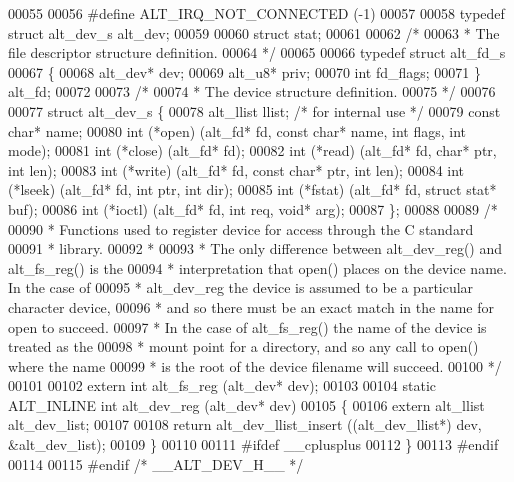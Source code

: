 \begin{DoxyCode}
00055 
00056 \textcolor{preprocessor}{#define ALT\_IRQ\_NOT\_CONNECTED (-1)}
00057 
00058 \textcolor{keyword}{typedef} \textcolor{keyword}{struct }alt_dev_s alt_dev;
00059 
00060 \textcolor{keyword}{struct }stat;
00061 
00062 \textcolor{comment}{/*}
00063 \textcolor{comment}{ * The file descriptor structure definition.}
00064 \textcolor{comment}{ */}
00065 
00066 \textcolor{keyword}{typedef} \textcolor{keyword}{struct }alt_fd_s
00067 \{
00068   alt_dev* dev;
00069   alt_u8*  priv;
00070   \textcolor{keywordtype}{int}      fd_flags;
00071 \} alt_fd;
00072 
00073 \textcolor{comment}{/* }
00074 \textcolor{comment}{ * The device structure definition. }
00075 \textcolor{comment}{ */}
00076  
00077 \textcolor{keyword}{struct }alt_dev_s \{
00078   alt_llist    llist;     \textcolor{comment}{/* for internal use */}
00079   \textcolor{keyword}{const} \textcolor{keywordtype}{char}*  name; 
00080   int (*open)  (alt_fd* fd, \textcolor{keyword}{const} \textcolor{keywordtype}{char}* name, \textcolor{keywordtype}{int} flags, \textcolor{keywordtype}{int} mode);
00081   int (*close) (alt_fd* fd);
00082   int (*read)  (alt_fd* fd, \textcolor{keywordtype}{char}* ptr, \textcolor{keywordtype}{int} len);
00083   int (*write) (alt_fd* fd, \textcolor{keyword}{const} \textcolor{keywordtype}{char}* ptr, \textcolor{keywordtype}{int} len); 
00084   int (*lseek) (alt_fd* fd, \textcolor{keywordtype}{int} ptr, \textcolor{keywordtype}{int} dir);
00085   int (*fstat) (alt_fd* fd, \textcolor{keyword}{struct }stat* buf);
00086   int (*ioctl) (alt_fd* fd, \textcolor{keywordtype}{int} req, \textcolor{keywordtype}{void}* arg);
00087 \};
00088 
00089 \textcolor{comment}{/*}
00090 \textcolor{comment}{ * Functions used to register device for access through the C standard }
00091 \textcolor{comment}{ * library.}
00092 \textcolor{comment}{ *}
00093 \textcolor{comment}{ * The only difference between alt\_dev\_reg() and alt\_fs\_reg() is the }
00094 \textcolor{comment}{ * interpretation that open() places on the device name. In the case of}
00095 \textcolor{comment}{ * alt\_dev\_reg the device is assumed to be a particular character device,}
00096 \textcolor{comment}{ * and so there must be an exact match in the name for open to succeed. }
00097 \textcolor{comment}{ * In the case of alt\_fs\_reg() the name of the device is treated as the}
00098 \textcolor{comment}{ * mount point for a directory, and so any call to open() where the name }
00099 \textcolor{comment}{ * is the root of the device filename will succeed. }
00100 \textcolor{comment}{ */}
00101 
00102 \textcolor{keyword}{extern} \textcolor{keywordtype}{int} alt_fs_reg  (alt_dev* dev); 
00103 
00104 \textcolor{keyword}{static} ALT_INLINE \textcolor{keywordtype}{int} alt_dev_reg (alt_dev* dev)
00105 \{
00106   \textcolor{keyword}{extern} alt_llist alt_dev_list;
00107 
00108   \textcolor{keywordflow}{return} alt_dev_llist_insert ((alt_dev_llist*) dev, &alt\_dev\_list);
00109 \}
00110 
00111 \textcolor{preprocessor}{#ifdef \_\_cplusplus}
00112 \}
00113 \textcolor{preprocessor}{#endif}
00114  
00115 \textcolor{preprocessor}{#endif }\textcolor{comment}{/* \_\_ALT\_DEV\_H\_\_ */}\textcolor{preprocessor}{}
\end{DoxyCode}
